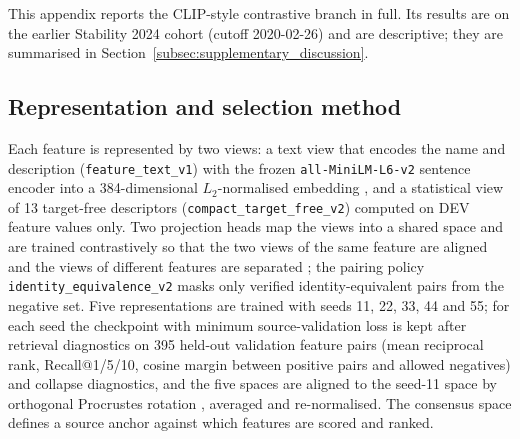 \documentclass[final,5p,twocolumn]{elsarticle}
\begin{document}
This appendix reports the CLIP-style contrastive branch in full. Its results are on the earlier Stability 2024 cohort (cutoff 2020-02-26) and are descriptive; they are summarised in Section~\ref{subsec:supplementary_discussion}.

\subsection{Representation and selection method}
\label{subsec:clip_fs}

\begin{sloppypar}
Each feature is represented by two views: a text view that encodes the name and description (\texttt{feature\_\allowbreak text\_\allowbreak v1}) with the frozen \texttt{all-\allowbreak MiniLM-\allowbreak L6-\allowbreak v2} sentence encoder into a 384-dimensional $L_2$-normalised embedding \cite{wang2020minilm,reimers2019}, and a statistical view of 13 target-free descriptors (\texttt{compact\_\allowbreak target\_\allowbreak free\_\allowbreak v2}) computed on DEV feature values only. Two projection heads map the views into a shared space and are trained contrastively so that the two views of the same feature are aligned and the views of different features are separated \cite{radford2021,oord2018}; the pairing policy \texttt{identity\_\allowbreak equivalence\_\allowbreak v2} masks only verified identity-equivalent pairs from the negative set. Five representations are trained with seeds 11, 22, 33, 44 and 55; for each seed the checkpoint with minimum source-validation loss is kept after retrieval diagnostics on 395 held-out validation feature pairs (mean reciprocal rank, Recall@1/5/10, cosine margin between positive pairs and allowed negatives) and collapse diagnostics, and the five spaces are aligned to the seed-11 space by orthogonal Procrustes rotation \cite{schonemann1966}, averaged and re-normalised. The consensus space defines a source anchor against which features are scored and ranked.
\end{sloppypar}
\end{document}
